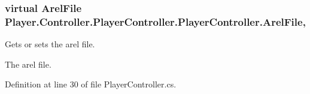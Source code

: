 \subsubsection[{Arel\-File}]{\setlength{\rightskip}{0pt plus 5cm}virtual {\bf Arel\-File} Player.\-Controller.\-Player\-Controller.\-Player\-Controller.\-Arel\-File\hspace{0.3cm}{\ttfamily [get]}, {\ttfamily [set]}}\label{class_player_1_1_controller_1_1_player_controller_1_1_player_controller_af8c90d7b79252403dd2560265234b2f3}


Gets or sets the arel file. 

The arel file. 

Definition at line 30 of file Player\-Controller.\-cs.


